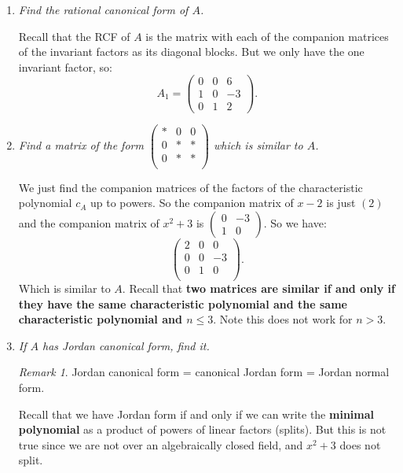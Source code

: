 \documentclass[9pt,reqno,twoside]{amsbook}
\theoremstyle{plain}
\numberwithin{section}{chapter}
\numberwithin{equation}{chapter}
\theoremstyle{definition}
\theoremstyle{remark}
\newtheorem{rem}[theorem]{Remark}
\theoremstyle{plain}
\newcommand{\lpar}{\left(}
\newcommand{\rpar}{\right)}
\renewcommand{\leq}{\leqslant}
\begin{document}
\begin{enumerate}[label=\arabic*.]
\begin{enumerate}
\item \textit{Find the rational canonical form of $A$. }

Recall that the RCF of $A$ is the matrix with each of the companion matrices of the invariant factors as its diagonal blocks. But we only have the one invariant factor, so:
$$
A_1 = \lpar 
\begin{matrix}
0 & 0 & 6\\
1 & 0 & -3\\
0 & 1 & 2
\end{matrix} \rpar. 
$$

\item \textit{Find a matrix of the form $\lpar \begin{matrix}
* & 0 & 0\\
0 & * & *\\
0 & * & *\\
\end{matrix} \rpar$ which is similar to $A$. }

We just find the companion matrices of the factors of the characteristic polynomial $c_A$ up to powers. So the companion matrix of $x - 2$ is just $(2)$ and the companion matrix of $x^2 + 3$ is $\lpar 
\begin{matrix}
0 & -3\\
1 & 0
\end{matrix} \rpar$. So we have:
$$
\lpar 
\begin{matrix}
2 & 0 & 0\\
0 & 0 & -3\\
0 & 1 & 0\\
\end{matrix} \rpar.
$$
Which is similar to $A$. Recall that \textbf{two matrices are similar if and only if they have the same characteristic polynomial and the same characteristic polynomial and $n \leq 3$}. Note this does not work for $n > 3$. 


\item \textit{If $A$ has Jordan canonical form, find it. }

\begin{rem}
Jordan canonical form = canonical Jordan form = Jordan normal form. 
\end{rem}

Recall that we have Jordan form if and only if we can write the \textbf{minimal polynomial} as a product of powers of linear factors (splits). But this is not true since we are not over an algebraically closed field, and $x^2+3$ does not split. 







\end{enumerate}
\end{enumerate}
\end{document}
